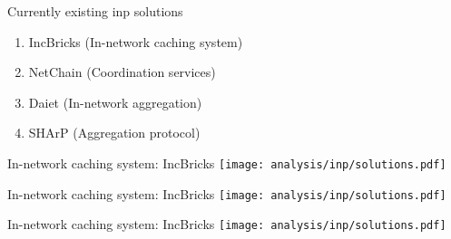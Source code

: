 \begin{frame}{Currently existing \gls{inp} solutions}
    \begin{enumerate}
        \item IncBricks (In-network caching system) %
        \item NetChain (Coordination services) %
        \item Daiet (In-network aggregation) %
        \item SHArP (Aggregation protocol) %
    \end{enumerate}
\end{frame}

\begin{frame}{In-network caching system: IncBricks}
    \centering
    \texttt{[image: analysis/inp/solutions.pdf]}
\end{frame}

\begin{frame}{In-network caching system: IncBricks}
    \centering
    \texttt{[image: analysis/inp/solutions.pdf]}
\end{frame}

\begin{frame}{In-network caching system: IncBricks}
    \centering
    \texttt{[image: analysis/inp/solutions.pdf]}
\end{frame}

